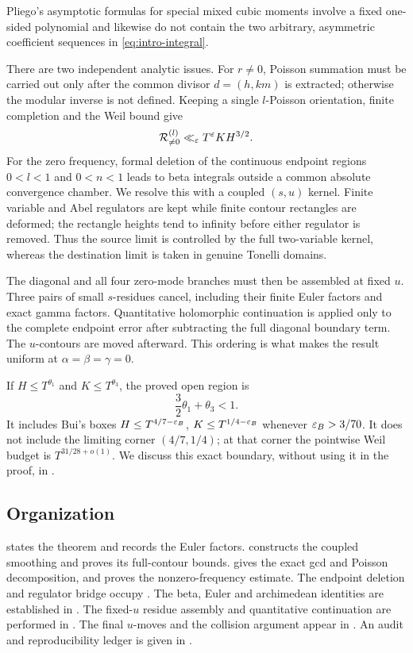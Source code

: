 Pliego's asymptotic formulas for special mixed cubic moments
\cite{Pliego2025} involve a fixed one-sided polynomial and likewise do not
contain the two arbitrary, asymmetric coefficient sequences in
\eqref{eq:intro-integral}.

There are two independent analytic issues.  For $r\neq0$, Poisson summation
must be carried out only after the common divisor $d=(h,km)$ is extracted;
otherwise the modular inverse is not defined.  Keeping a single $l$-Poisson
orientation, finite completion and the Weil bound give
\[
                 \mathcal R_{\neq0}^{(l)}
                 \ll_\varepsilon T^\varepsilon KH^{3/2}.
\]
For the zero frequency, formal deletion of the continuous endpoint regions
$0<l<1$ and $0<n<1$ leads to beta integrals outside a common absolute
convergence chamber.  We resolve this with a coupled $(s,u)$ kernel.  Finite
variable and Abel regulators are kept while finite contour rectangles are
deformed; the rectangle heights tend to infinity before either regulator is
removed.  Thus the source limit is controlled by the full two-variable
kernel, whereas the destination limit is taken in genuine Tonelli domains.

The diagonal and all four zero-mode branches must then be assembled at fixed
$u$.  Three pairs of small $s$-residues cancel, including their finite Euler
factors and exact gamma factors.  Quantitative holomorphic continuation is
applied only to the complete endpoint error after subtracting the full
diagonal boundary term.  The $u$-contours are moved afterward.  This ordering
is what makes the result uniform at $\alpha=\beta=\gamma=0$.

If $H\leq T^{\theta_1}$ and $K\leq T^{\theta_3}$, the proved open region is
\[
                         \frac32\theta_1+\theta_3<1.
\]
It includes Bui's boxes
$H\leq T^{4/7-\varepsilon_B}$, $K\leq T^{1/4-\varepsilon_B}$ whenever
$\varepsilon_B>3/70$.  It does not include the limiting corner $(4/7,1/4)$; at that
corner the pointwise Weil budget is $T^{31/28+o(1)}$.  We discuss this exact
boundary, without using it in the proof, in .

\subsection*{Organization}
 states the theorem and records the Euler factors.
 constructs the coupled smoothing and proves its
full-contour bounds.   gives the exact gcd and Poisson
decomposition, and  proves the nonzero-frequency estimate.
The endpoint deletion and regulator bridge occupy .
The beta, Euler and archimedean identities are established in
.  The fixed-$u$ residue assembly and quantitative continuation
are performed in .  The final $u$-moves and the collision
argument appear in .  An audit and reproducibility ledger is
given in .
